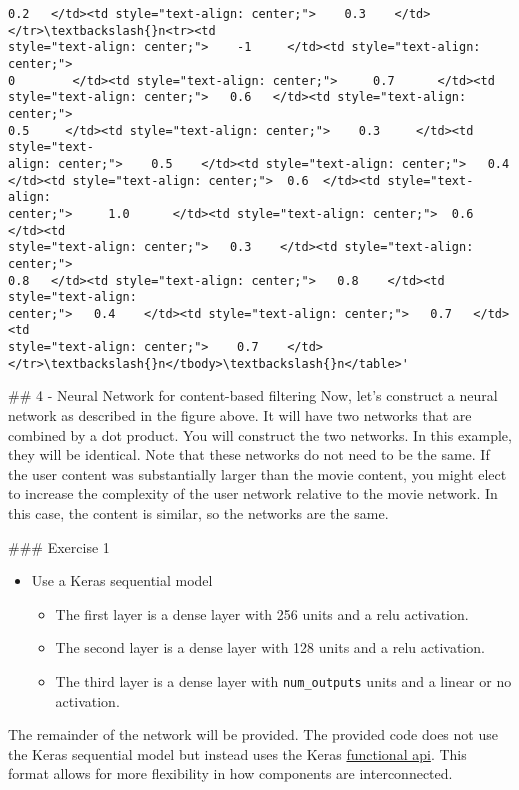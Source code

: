 \documentclass[11pt]{article}
\providecommand{\tightlist}{%
      \setlength{\itemsep}{0pt}\setlength{\parskip}{0pt}}
\begin{document}
\begin{tcolorbox}[breakable, size=fbox, boxrule=.5pt, pad at break*=1mm, opacityfill=0]
\begin{Verbatim}[commandchars=\\\{\}]
0.2   </td><td style="text-align: center;">    0.3    </td></tr>\textbackslash{}n<tr><td
style="text-align: center;">    -1     </td><td style="text-align: center;">
0        </td><td style="text-align: center;">     0.7      </td><td
style="text-align: center;">   0.6   </td><td style="text-align: center;">
0.5     </td><td style="text-align: center;">    0.3     </td><td style="text-
align: center;">    0.5    </td><td style="text-align: center;">   0.4
</td><td style="text-align: center;">  0.6  </td><td style="text-align:
center;">     1.0      </td><td style="text-align: center;">  0.6  </td><td
style="text-align: center;">   0.3    </td><td style="text-align: center;">
0.8   </td><td style="text-align: center;">   0.8    </td><td style="text-align:
center;">   0.4    </td><td style="text-align: center;">   0.7   </td><td
style="text-align: center;">    0.7    </td></tr>\textbackslash{}n</tbody>\textbackslash{}n</table>'
\end{Verbatim}
\end{tcolorbox}
        
    \#\# 4 - Neural Network for content-based filtering Now, let's construct
a neural network as described in the figure above. It will have two
networks that are combined by a dot product. You will construct the two
networks. In this example, they will be identical. Note that these
networks do not need to be the same. If the user content was
substantially larger than the movie content, you might elect to increase
the complexity of the user network relative to the movie network. In
this case, the content is similar, so the networks are the same.

\#\#\# Exercise 1

\begin{itemize}
\tightlist
\item
  Use a Keras sequential model

  \begin{itemize}
  \tightlist
  \item
    The first layer is a dense layer with 256 units and a relu
    activation.
  \item
    The second layer is a dense layer with 128 units and a relu
    activation.
  \item
    The third layer is a dense layer with \texttt{num\_outputs} units
    and a linear or no activation.
  \end{itemize}
\end{itemize}

The remainder of the network will be provided. The provided code does
not use the Keras sequential model but instead uses the Keras
\href{https://keras.io/guides/functional_api/}{functional api}. This
format allows for more flexibility in how components are interconnected.
\end{document}
